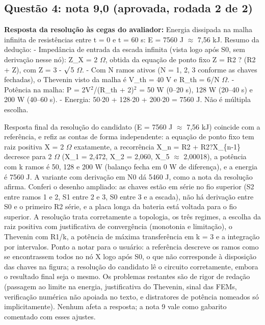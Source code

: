\documentclass{article}%
\begin{document}
\subsection*{Questão 4: nota 9,0 (aprovada, rodada 2 de 2)}%
\textbf{Resposta da resolução às cegas do avaliador:} Energia dissipada na malha infinita de resistências entre t = 0 e t = 60 s: E = 7560 J $\approx$ 7,56 kJ.\newline%
\newline%
Resumo da dedução:\newline%
{-} Impedância de entrada da escada infinita (vista logo após S0, sem derivação nesse nó): Z\_X = 2 $\Omega$, obtida da equação de ponto fixo Z = R2 ? (R2 + Z), com Z = 3 - $\surd$5 $\Omega$.\newline%
{-} Com N ramos ativos (N = 1, 2, 3 conforme as chaves fechadas), o Thevenin visto da malha é V\_th = 40 V e R\_th = 6/N $\Omega$.\newline%
{-} Potência na malha: P = 2V$^2$/(R\_th + 2)$^2$ = 50 W (0--20 s), 128 W (20--40 s) e 200 W (40--60 s).\newline%
{-} Energia: 50$\cdot$20 + 128$\cdot$20 + 200$\cdot$20 = 7560 J.\newline%
\newline%
Não é múltipla escolha.\par %
Resposta final da resolução do candidato (E = 7560 J $\approx$ 7,56 kJ) coincide com a referência, e refiz as contas de forma independente: a equação de ponto fixo tem raiz positiva X = 2 $\Omega$ exatamente, a recorrência X\_n = R2 + R2?X\_\{n-1\} decresce para 2 $\Omega$ (X\_1 = 2,472, X\_2 = 2,060, X\_5 $\approx$ 2,00018), a potência com k ramos é 50, 128 e 200 W (balanço fecha em 0 W de diferença), e a energia é 7560 J. A variante com derivação em N0 dá 5460 J, como a nota da resolução afirma. Conferi o desenho ampliado: as chaves estão em série no fio superior (S2 entre ramos 1 e 2, S1 entre 2 e 3, S0 entre 3 e a escada), não há derivação entre S0 e o primeiro R2 série, e a placa longa da bateria está voltada para o fio superior. A resolução trata corretamente a topologia, os três regimes, a escolha da raiz positiva com justificativa de convergência (monotonia e limitação), o Thevenin com R1/k, a potência de máxima transferência em k = 3 e a integração por intervalos. Ponto a notar para o usuário: a referência descreve os ramos como se encontrassem todos no nó X logo após S0, o que não corresponde à disposição das chaves na figura; a resolução do candidato lê o circuito corretamente, embora o resultado final seja o mesmo. Os problemas restantes são de rigor de redação (passagem ao limite na energia, justificativa do Thevenin, sinal das FEMs, verificação numérica não apoiada no texto, e distratores de potência nomeados só implicitamente). Nenhum afeta a resposta; a nota 9 vale como gabarito comentado com esses ajustes.%
\end{document}
